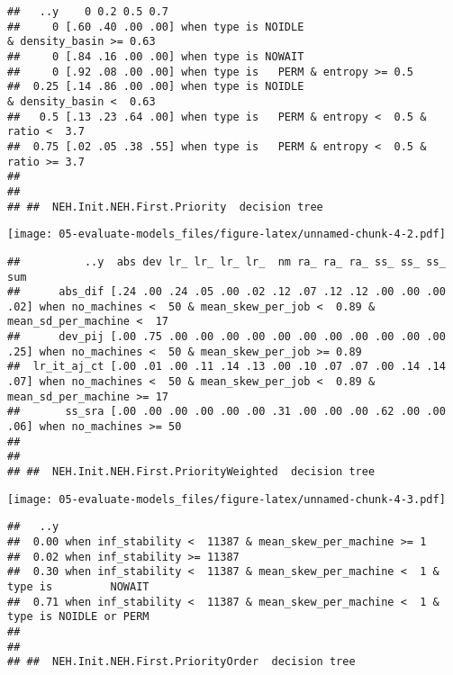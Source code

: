 \documentclass[
]{article}
\begin{document}
\begin{verbatim}
##   ..y    0 0.2 0.5 0.7                                                                             
##     0 [.60 .40 .00 .00] when type is NOIDLE                                 & density_basin >= 0.63
##     0 [.84 .16 .00 .00] when type is NOWAIT                                                        
##     0 [.92 .08 .00 .00] when type is   PERM & entropy >= 0.5                                       
##  0.25 [.14 .86 .00 .00] when type is NOIDLE                                 & density_basin <  0.63
##   0.5 [.13 .23 .64 .00] when type is   PERM & entropy <  0.5 & ratio <  3.7                        
##  0.75 [.02 .05 .38 .55] when type is   PERM & entropy <  0.5 & ratio >= 3.7                        
## 
## 
## ##  NEH.Init.NEH.First.Priority  decision tree
\end{verbatim}

\texttt{[image: 05-evaluate-models\_files/figure-latex/unnamed-chunk-4-2.pdf]}

\begin{verbatim}
##          ..y  abs dev lr_ lr_ lr_ lr_  nm ra_ ra_ ra_ ss_ ss_ ss_ sum                                                                                
##      abs_dif [.24 .00 .24 .05 .00 .02 .12 .07 .12 .12 .00 .00 .00 .02] when no_machines <  50 & mean_skew_per_job <  0.89 & mean_sd_per_machine <  17
##      dev_pij [.00 .75 .00 .00 .00 .00 .00 .00 .00 .00 .00 .00 .00 .25] when no_machines <  50 & mean_skew_per_job >= 0.89                            
##  lr_it_aj_ct [.00 .01 .00 .11 .14 .13 .00 .10 .07 .07 .00 .14 .14 .07] when no_machines <  50 & mean_skew_per_job <  0.89 & mean_sd_per_machine >= 17
##       ss_sra [.00 .00 .00 .00 .00 .00 .31 .00 .00 .00 .62 .00 .00 .06] when no_machines >= 50                                                        
## 
## 
## ##  NEH.Init.NEH.First.PriorityWeighted  decision tree
\end{verbatim}

\texttt{[image: 05-evaluate-models\_files/figure-latex/unnamed-chunk-4-3.pdf]}

\begin{verbatim}
##   ..y                                                                                  
##  0.00 when inf_stability <  11387 & mean_skew_per_machine >= 1                         
##  0.02 when inf_stability >= 11387                                                      
##  0.30 when inf_stability <  11387 & mean_skew_per_machine <  1 & type is         NOWAIT
##  0.71 when inf_stability <  11387 & mean_skew_per_machine <  1 & type is NOIDLE or PERM
## 
## 
## ##  NEH.Init.NEH.First.PriorityOrder  decision tree
\end{verbatim}
\end{document}
